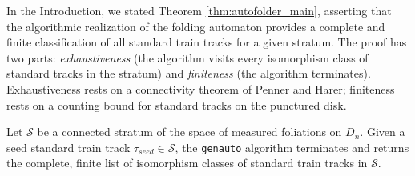 In the Introduction, we stated Theorem \ref{thm:autofolder_main}, asserting that the algorithmic realization of the folding automaton provides a complete and finite classification of all standard train tracks for a given stratum. The proof has two parts: \textit{exhaustiveness} (the algorithm visits every isomorphism class of standard tracks in the stratum) and \textit{finiteness} (the algorithm terminates). Exhaustiveness rests on a connectivity theorem of Penner and Harer; finiteness rests on a counting bound for standard tracks on the punctured disk.

\begin{theorem}
\label{thm:genauto_completeness}
    Let $\mathcal{S}$ be a connected stratum of the space of measured foliations on $D_n$. Given a seed standard train track $\tau_{seed} \in \mathcal{S}$, the \texttt{genauto} algorithm terminates and returns the complete, finite list of isomorphism classes of standard train tracks in $\mathcal{S}$.
\end{theorem}

